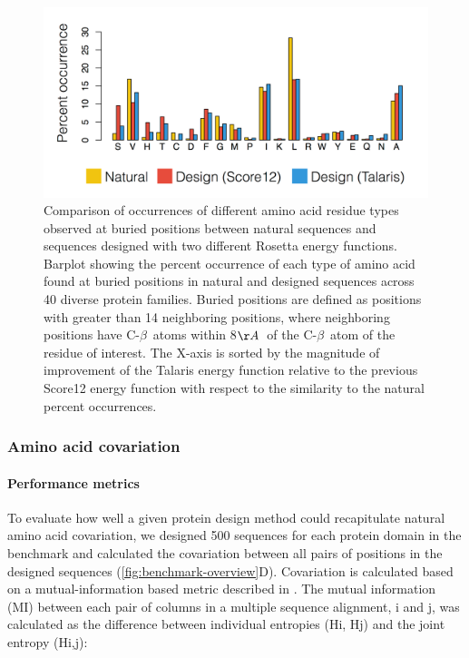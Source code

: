 \begin{figure}[H]
  \centering

  \includegraphics[width=\textwidth,keepaspectratio]{figures/benchmark-fig2.png}
  \caption[Comparison of occurrences of different amino acid residue types observed at buried positions between natural sequences and sequences designed with two different Rosetta energy functions]{Comparison of occurrences of different amino acid residue types observed at buried positions between natural sequences and sequences designed with two different Rosetta energy functions.
Barplot showing the percent occurrence of each type of amino acid found at buried positions in natural and designed sequences across 40 diverse protein families. Buried positions are defined as positions with greater than 14 neighboring positions, where neighboring positions have C-$\beta$\ atoms within 8$\AA$\ of the C-$\beta$\ atom of the residue of interest. The X-axis is sorted by the magnitude of improvement of the Talaris energy function relative to the previous Score12 energy function with respect to the similarity to the natural percent occurrences.}
  \label{fig:benchmark-occurance}
\end{figure}

\subsubsection{Amino acid covariation}

\paragraph{Performance metrics}

To evaluate how well a given protein design method could recapitulate natural amino acid covariation, we designed 500 sequences for each protein domain in the benchmark and calculated the covariation between all pairs of positions in the designed sequences (\cref{fig:benchmark-overview}D). Covariation is calculated based on a mutual-information based metric described in \cite{dickson_identifying_2010}. The mutual information (MI) between each pair of columns in a multiple sequence alignment, i and j, was calculated as the difference between individual entropies (Hi, Hj) and the joint entropy (Hi,j):




